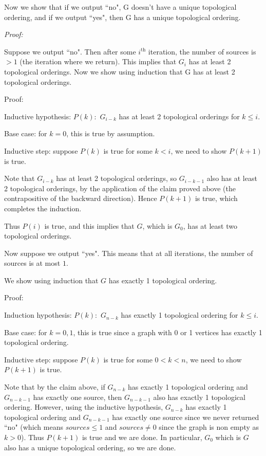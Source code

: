 \documentclass[answers]{exam}
\begin{document}
\begin{questions}
\begin{solution}
Now we show that if we output ``no", G doesn't have a unique topological ordering, and if we output ``yes", then G has a unique topological ordering.

\textit{Proof:}

Suppose we output ``no". Then after some $i^\mathrm{th}$ iteration, the number of sources is $> 1$ (the iteration where we return). This implies that $G_{i}$ has at least 2 topological orderings.
Now we show using induction that G has at least 2 topological orderings.

Proof:

Inductive hypothesis: $P(k):$ $G_{i - k}$ has at least 2 topological orderings for $k \le i$.

Base case: for $k = 0$, this is true by assumption.

Inductive step: suppose $P(k)$ is true for some $k < i$, we need to show $P(k + 1)$ is true.

Note that $G_{i - k}$ has at least 2 topological orderings, so $G_{i - k - 1}$ also has at least 2 topological orderings, by the application of the claim proved above (the contrapositive of the
backward direction). Hence $P(k + 1)$ is true, which completes the induction.

Thus $P(i)$ is true, and this implies that $G$, which is $G_0$, has at least two topological orderings.

Now suppose we output ``yes". This means that at all iterations, the number of sources is at most $1$.

We show using induction that $G$ has exactly 1 topological ordering.

Proof:

Induction hypothesis: $P(k):$ $G_{n - k}$ has exactly 1 topological ordering for $k \le i$.

Base case: for $k = 0, 1$, this is true since a graph with 0 or 1 vertices has exactly 1 topological ordering.

Inductive step: suppose $P(k)$ is true for some $0 < k < n$, we need to show $P(k + 1)$ is true.

Note that by the claim above, if $G_{n - k}$ has exactly 1 topological ordering and $G_{n - k - 1}$ has exactly one source, then $G_{n - k - 1}$ also has exactly 1 topological ordering. However, using
the inductive hypothesis, $G_{n - k}$ has exactly 1 topological ordering and $G_{n - k - 1}$ has exactly one source since we never returned ``no" (which means $sources \le 1$ and $sources \neq 0$
since the graph is non empty as $k > 0$). Thus $P(k + 1)$ is true and we are done.
In particular, $G_0$ which is $G$ also has a unique topological ordering, so we are done.


\end{solution}
\end{questions}
\end{document}
